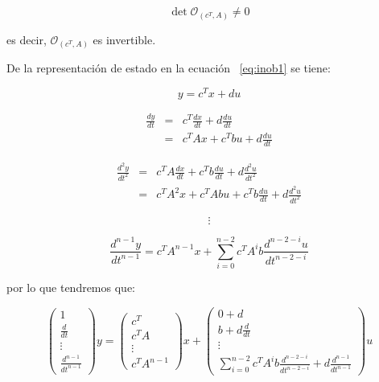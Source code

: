 	\begin{equation*}
		\det{\mathcal{O}_{(c^T, A)}} \ne 0
	\end{equation*}

	es decir, $\mathcal{O}_{(c^T, A)}$ es invertible.

	De la representación de estado en la ecuación ~\ref{eq:inob1} se tiene:

	\begin{equation*}
		y = c^T x + d u
	\end{equation*}

	\begin{eqnarray*}
		\frac{dy}{dt} & = & c^T \frac{dx}{dt} + d \frac{du}{dt} \\
		& = & c^T A x + c^T b u + d \frac{du}{dt}
	\end{eqnarray*}

	\begin{eqnarray*}
		\frac{d^2y}{dt^2} & = & c^T A \frac{dx}{dt} + c^T b \frac{du}{dt} + d \frac{d^2u}{dt^2} \\
		& = & c^T A^2 x + c^T A b u + c^T b \frac{du}{dt} + d \frac{d^2u}{dt^2}
	\end{eqnarray*}

	\begin{equation*}
		\vdots
	\end{equation*}

	\begin{equation*}
		\frac{d^{n-1}y}{dt^{n-1}} = c^T A^{n-1} x + \sum_{i=0}^{n-2} c^T A^i b \frac{d^{n-2-i}u}{dt^{n-2-i}}
	\end{equation*}

	por lo que tendremos que:

	\begin{equation*}
		\begin{pmatrix}
			1 \\
			\frac{d}{dt} \\
			\vdots \\
			\frac{d^{n-1}}{dt^{n-1}}
		\end{pmatrix} y =
		\begin{pmatrix}
			c^T \\
			c^T A \\
			\vdots \\
			c^T A^{n-1}
		\end{pmatrix} x +
		\begin{pmatrix}
			0 + d \\
			b + d \frac{d}{dt} \\
			\vdots \\
			\sum_{i=0}^{n-2} c^T A^i b \frac{d^{n-2-i}}{dt^{n-2-i}} + d \frac{d^{n-1}}{dt^{n-1}}
		\end{pmatrix} u
	\end{equation*}

